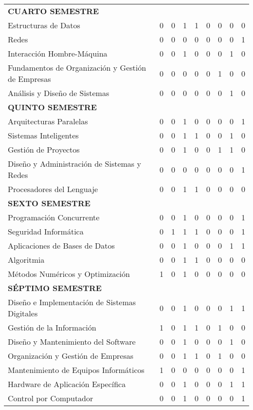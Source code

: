 \begin{table}[]
{\begin{tabular}{ lrrrrrrrr }
\textbf{CUARTO SEMESTRE} &  &  &  &  &  &  &  &  \\  
Estructuras de Datos & 0 & 0 & 1 & 1 & 0 & 0 & 0 & 0 \\  
Redes & 0 & 0 & 0 & 0 & 0 & 0 & 0 & 1 \\  
Interacción Hombre-Máquina & 0 & 0 & 1 & 0 & 0 & 0 & 1 & 0 \\  
Fundamentos de Organización y Gestión de Empresas & 0 & 0 & 0 & 0 & 0 & 1 & 0 & 0 \\  
Análisis y Diseño de Sistemas & 0 & 0 & 0 & 0 & 0 & 0 & 1 & 0 \\  
\textbf{QUINTO SEMESTRE} &  &  &  &  &  &  &  &  \\ 
Arquitecturas Paralelas & 0 & 0 & 1 & 0 & 0 & 0 & 0 & 1 \\ 
Sistemas Inteligentes & 0 & 0 & 1 & 1 & 0 & 0 & 1 & 0 \\ 
Gestión de Proyectos & 0 & 0 & 1 & 0 & 0 & 1 & 1 & 0 \\ 
Diseño y Administración de Sistemas y Redes & 0 & 0 & 0 & 0 & 0 & 0 & 0 & 1 \\  
Procesadores del Lenguaje & 0 & 0 & 1 & 1 & 0 & 0 & 0 & 0 \\  
\textbf{SEXTO SEMESTRE} &  &  &  &  &  &  &  &  \\ 
Programación Concurrente & 0 & 0 & 1 & 0 & 0 & 0 & 0 & 1 \\  
Seguridad Informática & 0 & 1 & 1 & 1 & 0 & 0 & 0 & 1 \\ 
Aplicaciones de Bases de Datos & 0 & 0 & 1 & 0 & 0 & 0 & 1 & 1 \\  
Algoritmia & 0 & 0 & 1 & 1 & 0 & 0 & 0 & 0 \\ 
Métodos Numéricos y Optimización & 1 & 0 & 1 & 0 & 0 & 0 & 0 & 0 \\  
\textbf{SÉPTIMO SEMESTRE} &  &  &  &  &  &  &  &  \\  
Diseño e Implementación de Sistemas Digitales & 0 & 0 & 1 & 0 & 0 & 0 & 1 & 1 \\ 
Gestión de la Información & 1 & 0 & 1 & 1 & 0 & 1 & 0 & 0 \\ 
Diseño y Mantenimiento del Software & 0 & 0 & 1 & 0 & 0 & 0 & 1 & 0 \\  
Organización y Gestión de Empresas & 0 & 0 & 1 & 1 & 0 & 1 & 0 & 0 \\  
 Mantenimiento de Equipos Informáticos & 1 & 0 & 0 & 0 & 0 & 0 & 0 & 1 \\  
Hardware de Aplicación Específica & 0 & 0 & 1 & 0 & 0 & 0 & 1 & 1 \\ 
Control por Computador & 0 & 0 & 1 & 0 & 0 & 0 & 0 & 1 \\ 

\end{tabular}}
\end{table}

